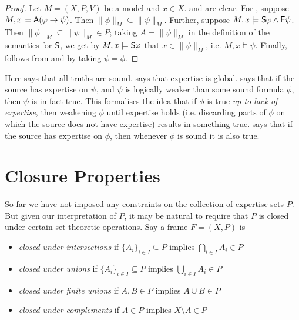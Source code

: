 \begin{proof}

    Let $M = (X, P, V)$ be a model and $x \in X$.  and
     are clear. For , suppose $M, x
    \models \A(\phi \limplies \psi)$. Then $\|\phi\|_M \subseteq \|\psi\|_M$.
    Further, suppose $M, x \models \S\phi \land \E\psi$. Then $\|\phi\|_M
    \subseteq \|\psi\|_M \in P$; taking $A = \|\psi\|_M$ in the definition of
    the semantics for $\S$, we get by $M, x \models \S\phi$ that $x \in
    \|\psi\|_M$, i.e. $M, x \models \psi$. Finally, 
    follows from  and  by taking
    $\psi = \phi$.

\end{proof}

Here  says that all truths are sound.
 says that expertise is global.  says
that if the source has expertise on $\psi$, and $\psi$ is logically weaker than
some sound formula $\phi$, then $\psi$ is in fact true. This formalises the
idea that if $\phi$ is true \emph{up to lack of expertise}, then weakening
$\phi$ until expertise holds (i.e. discarding parts of $\phi$ on which the
source does not have expertise) results in something true. 
says that if the source has expertise on $\phi$, then whenever $\phi$ is sound
it is also true.

\section{Closure Properties}
\label{sec_closure_properties}

So far we have not imposed any constraints on the collection of expertise sets
$P$. But given our interpretation of $P$, it may be natural to
require that $P$ is closed under certain set-theoretic operations. Say
a frame $F = (X, P)$ is

\begin{itemize}

    \item \emph{closed under intersections} if $\{A_i\}_{i \in I} \subseteq P$
          implies $\bigcap_{i \in I}{A_i} \in P$

    \item \emph{closed under unions} if $\{A_i\}_{i \in I} \subseteq P$ implies
          $\bigcup_{i \in I}{A_i} \in P$

    \item \emph{closed under finite unions} if $A, B \in P$ implies $A \cup B
          \in P$

    \item \emph{closed under complements} if $A \in P$ implies $X \setminus A
          \in P$

\end{itemize}

